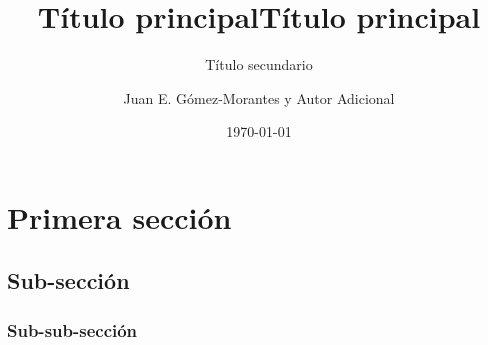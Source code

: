 \documentclass[hidelinks]{article}
\title{Título principal}
\subtitle{Título secundario}
\author{Juan E. Gómez-Morantes y Autor Adicional}
\date{\today}
\title{Título principal}
\begin{document}
\maketitle

\section{Primera sección}
\label{sec:orgce6a394}
\lipsum[1-3]
\subsection{Sub-sección}
\label{sec:org7f8a241}
\lipsum[4-5]
\subsubsection{Sub-sub-sección}
\label{sec:orgf6fddb5}
\lipsum[6-8]
\end{document}
